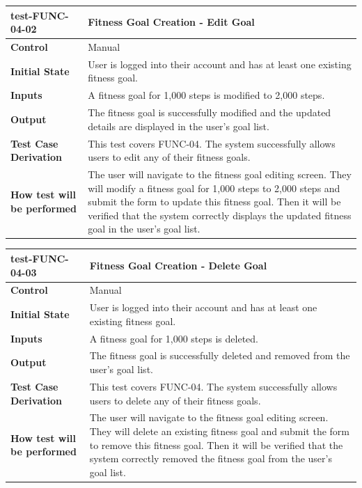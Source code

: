 \documentclass[12pt, titlepage]{article}
\begin{document}
\vspace{1em}

\noindent\begin{tabularx}{\textwidth}{>{\raggedright\arraybackslash}p{3.5cm}X}
  \toprule
  \textbf{test-FUNC-04-02} & \textbf{Fitness Goal Creation - Edit Goal}\\
  \midrule
  \textbf{Control} & Manual\\
  \textbf{Initial State} & User is logged into their account and has at least one existing fitness goal.\\
  \textbf{Inputs} & A fitness goal for 1,000 steps is modified to 2,000 steps.\\
  \textbf{Output} & The fitness goal is successfully modified and the updated details are displayed in the user's goal list.\\
  \textbf{Test Case Derivation} & This test covers FUNC-04. The system successfully allows users to edit any of their fitness goals.\\
  \textbf{How test will be performed} & The user will navigate to the fitness goal editing screen. They will modify a fitness goal for 1,000 steps to 2,000 steps and submit the form to update this fitness goal. Then it will be verified that the system correctly displays the updated fitness goal in the user's goal list.\\
  \bottomrule
\end{tabularx}

\vspace{1em}

\noindent\begin{tabularx}{\textwidth}{>{\raggedright\arraybackslash}p{3.5cm}X}
  \toprule
  \textbf{test-FUNC-04-03} & \textbf{Fitness Goal Creation - Delete Goal}\\
  \midrule
  \textbf{Control} & Manual\\
  \textbf{Initial State} & User is logged into their account and has at least one existing fitness goal.\\
  \textbf{Inputs} & A fitness goal for 1,000 steps is deleted.\\
  \textbf{Output} & The fitness goal is successfully deleted and removed from the user's goal list.\\
  \textbf{Test Case Derivation} & This test covers FUNC-04. The system successfully allows users to delete any of their fitness goals.\\
  \textbf{How test will be performed} & The user will navigate to the fitness goal editing screen. They will delete an existing fitness goal and submit the form to remove this fitness goal. Then it will be verified that the system correctly removed the fitness goal from the user's goal list.\\
  \bottomrule
\end{tabularx}
\end{document}
